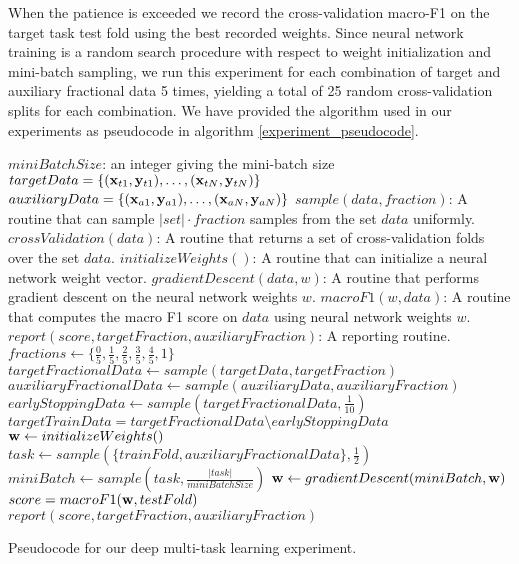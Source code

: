 When the patience is exceeded we record the cross-validation macro-F1 on the target task test fold using the best recorded weights. Since neural network training is a random search procedure with respect to weight initialization and mini-batch sampling, we run this experiment for each combination of target and auxiliary fractional data 5 times, yielding a total of 25 random cross-validation splits for each combination. We have provided the algorithm used in our experiments as pseudocode in algorithm \ref{experiment_pseudocode}.
\begin{algorithm}
\begin{algorithmic}
	\Require $miniBatchSize$: an integer giving the mini-batch size
	\Require $targetData = \{(\mathbf{x}_{t1},\mathbf{y}_{t1}),\dots,(\mathbf{x}_{tN},\mathbf{y}_{tN})\}$
	\Require $auxiliaryData = \{(\mathbf{x}_{a1},\mathbf{y}_{a1}),\dots,(\mathbf{x}_{aN},\mathbf{y}_{aN})\}$
	\Require $sample(data, fraction)$: A routine that can sample $|set| \cdot fraction$ samples from the set $data$ uniformly.
	\Require $crossValidation(data)$: A routine that returns a set of cross-validation folds over the set $data$.
	\Require $initializeWeights()$: A routine that can initialize a neural network weight vector.
	\Require $gradientDescent(data, w)$: A routine that performs gradient descent on the neural network weights $w$.
	\Require $macroF1(w, data)$: A routine that computes the macro F1 score on $data$ using neural network weights $w$.
	\Require $report(score, targetFraction, auxiliaryFraction)$: A reporting routine.
	\State $fractions \gets \{\frac{0}{5}, \frac{1}{5}, \frac{2}{5}, \frac{3}{5}, \frac{4}{5}, 1\}$
				\State $targetFractionalData \gets sample(targetData, targetFraction)$
				\State $auxiliaryFractionalData \gets sample(auxiliaryData, auxiliaryFraction)$
				\State $earlyStoppingData \gets sample(targetFractionalData, \frac{1}{10})$
				\State $targetTrainData = targetFractionalData \setminus earlyStoppingData$
					\State $\mathbf{w} \gets initializeWeights()$
						\State $task \gets sample(\{trainFold, auxiliaryFractionalData\}, \frac{1}{2})$
						\State $miniBatch \gets sample(task, \frac{|task|}{miniBatchSize})$
						\State $\mathbf{w} \gets gradientDescent(miniBatch, \mathbf{w})$
					\EndWhile
					\State $score = macroF1(\mathbf{w}, testFold)$
					\State $report(score, targetFraction, auxiliaryFraction)$
				\EndFor
			\EndFor
		\EndFor
	\EndFor
\end{algorithmic}
\caption{Pseudocode for our deep multi-task learning experiment.}\label{experiment_pseudocode}
\end{algorithm}
